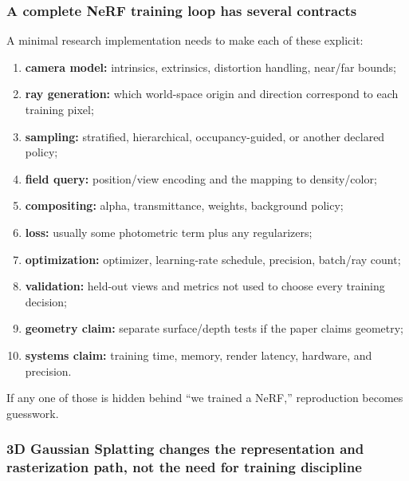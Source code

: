 \subsubsection{A complete NeRF training loop has several contracts}\label{04-visual-computing-ii-ch035-a-complete-nerf-training-loop-has-several-contracts}

\hypertarget{04-visual-computing-ii-ch035-a-complete-nerf-training-loop-has-several-contracts}{}

A minimal research implementation needs to make each of these explicit:

\begin{enumerate}
\def\labelenumi{\arabic{enumi}.}
\tightlist
\item
  \textbf{camera model:} intrinsics, extrinsics, distortion handling, near/far bounds;
\item
  \textbf{ray generation:} which world-space origin and direction correspond to each training pixel;
\item
  \textbf{sampling:} stratified, hierarchical, occupancy-guided, or another declared policy;
\item
  \textbf{field query:} position/view encoding and the mapping to density/color;
\item
  \textbf{compositing:} alpha, transmittance, weights, background policy;
\item
  \textbf{loss:} usually some photometric term plus any regularizers;
\item
  \textbf{optimization:} optimizer, learning-rate schedule, precision, batch/ray count;
\item
  \textbf{validation:} held-out views and metrics not used to choose every training decision;
\item
  \textbf{geometry claim:} separate surface/depth tests if the paper claims geometry;
\item
  \textbf{systems claim:} training time, memory, render latency, hardware, and precision.
\end{enumerate}

If any one of those is hidden behind ``we trained a NeRF,'' reproduction becomes guesswork.

\subsubsection{3D Gaussian Splatting changes the representation and rasterization path, not the need for training discipline}\label{04-visual-computing-ii-ch035-d-gaussian-splatting-changes-the-representation-and-rasterization-path-not-the-need-for-training-discipline}

